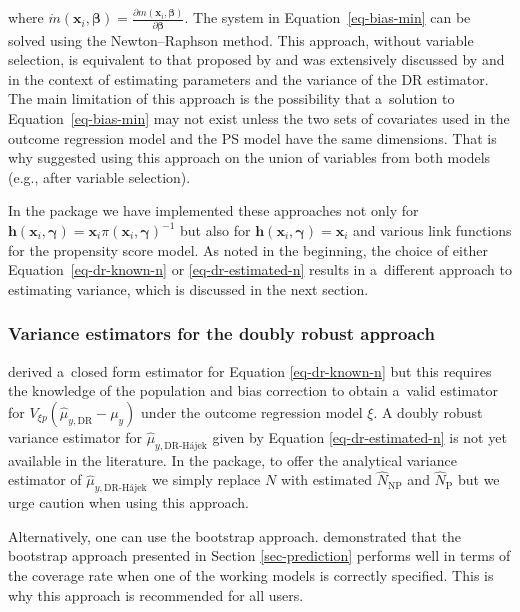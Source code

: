 \documentclass[nojss]{jss}
\begin{document}
where
\(\dot{m}\left(\boldsymbol{x}_i, \boldsymbol{\beta}\right)=\frac{\partial m\left(\boldsymbol{x}_i, \boldsymbol{\beta}\right)}{\partial \boldsymbol{\beta}}\).
The system in Equation~\ref{eq-bias-min} can be solved using the
Newton--Raphson method. This approach, without variable selection, is
equivalent to that proposed by \citet{kim2014doubly} and was extensively
discussed by \citet{chen2020doubly} and \citet{wu2022statistical} in the
context of estimating parameters and the variance of the DR estimator.
The main limitation of this approach is the possibility that a~solution
to Equation~\ref{eq-bias-min} may not exist unless the two sets of
covariates used in the outcome regression model and the PS model have
the same dimensions. That is why \citet{yang_doubly_2020} suggested
using this approach on the union of variables from both models (e.g.,
after variable selection).

In the  package we have implemented these approaches not
only for
\(\boldsymbol{h}(\boldsymbol{x}_i, \boldsymbol{\gamma})=\boldsymbol{x}_i \pi\left(\boldsymbol{x}_i, \boldsymbol{\gamma}\right)^{-1}\)
but also for
\(\boldsymbol{h}(\boldsymbol{x}_i, \boldsymbol{\gamma})=\boldsymbol{x}_i\)
and various link functions for the propensity score model. As noted in
the beginning, the choice of either Equation~\ref{eq-dr-known-n} or
\ref{eq-dr-estimated-n} results in a~different approach to estimating
variance, which is discussed in the next section.

\subsubsection{Variance estimators for the doubly robust
approach}\label{variance-estimators-for-the-doubly-robust-approach}

\citet{yang_doubly_2020} derived a~closed form estimator for Equation
\ref{eq-dr-known-n} but this requires the knowledge of the population
and bias correction to obtain a~valid estimator for
\(V_{\xi p}\left(\hat{\mu}_{y,\text{DR}}-\mu_y\right)\) under the
outcome regression model \(\xi\). A doubly robust variance estimator for
\(\hat{\mu}_{y,\text{DR-H\'{a}jek}}\) given by Equation
\ref{eq-dr-estimated-n} is not yet available in the literature. In the
package, to offer the analytical variance estimator of
\(\hat{\mu}_{y,\text{DR-H\'{a}jek}}\) we simply replace \(N\) with
estimated \(\hat{N}_{\text{NP}}\) and \(\hat{N}_{\text{P}}\) but we urge
caution when using this approach.

Alternatively, one can use the bootstrap approach.
\citet{chen2020doubly} demonstrated that the bootstrap approach
presented in Section \ref{sec-prediction} performs well in terms of the
coverage rate when one of the working models is correctly specified.
This is why this approach is recommended for all users.
\end{document}

